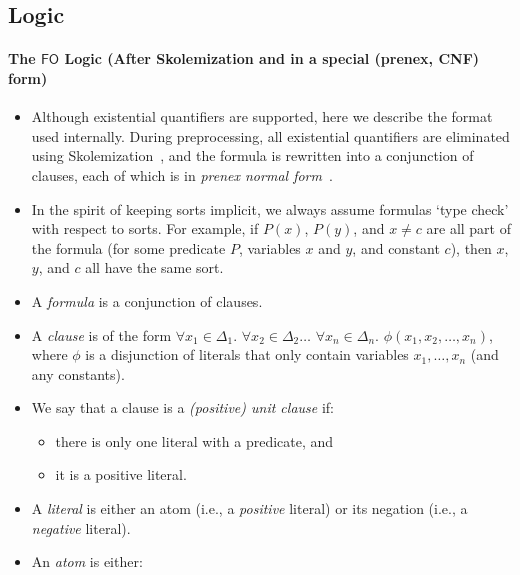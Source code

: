 \documentclass{article}
\theoremstyle{definition}
\newcommand{\FO}{$\mathsf{FO}$}
\begin{document}
\subsection{Logic}\label{sec:logic}


\paragraph{The \FO{} Logic (After Skolemization and in a special (prenex, CNF)
  form)}
\begin{itemize}
  \item Although existential quantifiers are supported, here we describe the
        format used internally. During preprocessing, all existential
        quantifiers are eliminated using
        Skolemization~\cite{DBLP:conf/kr/BroeckMD14}, and the formula is
        rewritten into a conjunction of clauses, each of which is in
        \emph{prenex normal form}~\cite{hinman2018fundamentals}.
  \item In the spirit of keeping sorts implicit, we always assume formulas `type
        check' with respect to sorts. For example, if $P(x)$, $P(y)$, and
        $x \ne c$ are all part of the formula (for some predicate $P$, variables
        $x$ and $y$, and constant $c$), then $x$, $y$, and $c$ all have the same
        sort.
  \item A \emph{formula} is a conjunction of clauses.
  \item A \emph{clause} is of the form $\forall x_{1} \in \Delta_{1}\text{.
        }\forall x_{2} \in \Delta_{2}\dots\text{
        }\forall x_{n} \in \Delta_{n}\text{. }\phi(x_{1}, x_{2}, \dots, x_{n})$,
        where $\phi$ is a disjunction of literals that only contain variables
        $x_{1}, \dots, x_{n}$ (and any constants).
  \item We say that a clause is a \emph{(positive) unit clause} if:
        \begin{itemize}
          \item there is only one literal with a predicate, and
          \item it is a positive literal.
        \end{itemize}
  \item A \emph{literal} is either an atom (i.e., a \emph{positive} literal) or
        its negation (i.e., a \emph{negative} literal).
  \item An \emph{atom} is either:

\end{itemize}
\end{document}
